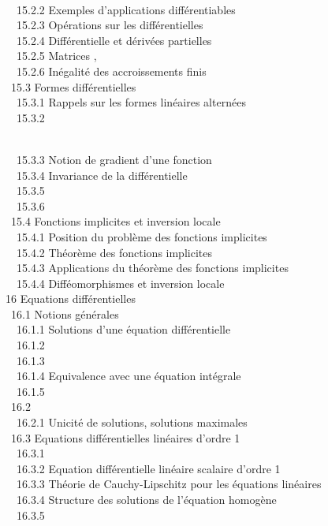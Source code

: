\documentclass[]{article}
\begin{document}
\\ ~~15.2.2 {Exemples
d'applications différentiables} \\ ~~15.2.3
{Opérations sur les
différentielles} \\ ~~15.2.4
{Différentielle et dérivées
partielles} \\ ~~15.2.5
{Matrices \jmathacobiennes,
\jmathacobiens} \\ ~~15.2.6
{Inégalité des accroissements
finis} \\ ~15.3 {Formes
différentielles} \\ ~~15.3.1
{Rappels sur les formes
linéaires alternées} \\ ~~15.3.2

\\ ~~15.3.3 {Notion de gradient
d'une fonction} \\ ~~15.3.4
{Invariance de la
différentielle} \\ ~~15.3.5
 \\
~~15.3.6 
\\ ~15.4 {Fonctions implicites et
inversion locale} \\ ~~15.4.1
{Position du problème des
fonctions implicites} \\ ~~15.4.2
{Théorème des fonctions
implicites} \\ ~~15.4.3
{Applications du théorème des
fonctions implicites} \\ ~~15.4.4
{Difféomorphismes et inversion
locale} \\ 16 {Equations
différentielles} \\ ~16.1 {Notions
générales} \\ ~~16.1.1
{Solutions d'une équation
différentielle} \\ ~~16.1.2
 \\ ~~16.1.3
 \\
~~16.1.4 {Equivalence avec une
équation intégrale} \\ ~~16.1.5
 \\ ~16.2
 \\
~~16.2.1 {Unicité de solutions,
solutions maximales} \\ ~16.3
{Equations différentielles
linéaires d'ordre 1} \\ ~~16.3.1
 \\ ~~16.3.2
{Equation différentielle
linéaire scalaire d'ordre 1} \\ ~~16.3.3
{Théorie de Cauchy-Lipschitz
pour les équations linéaires} \\ ~~16.3.4
{Structure des solutions de
l'équation homogène} \\ ~~16.3.5
\end{document}

